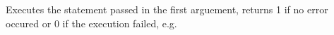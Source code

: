 Executes the statement passed in the first arguement, returns
  1 if no error occured or 0 if the execution failed, e.g.
